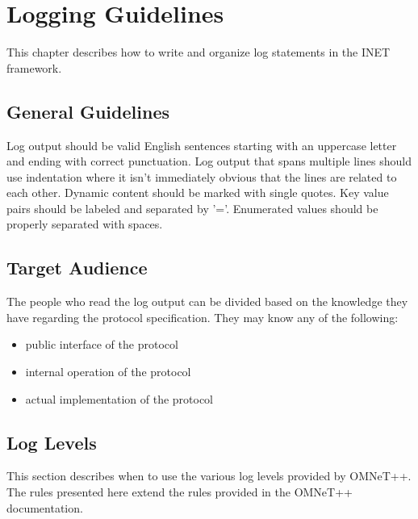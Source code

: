 \chapter{Logging Guidelines}
\label{cha:logging}


This chapter describes how to write and organize log statements in the INET
framework.

\section{General Guidelines}

Log output should be valid English sentences starting with an uppercase letter
and ending with correct punctuation. Log output that spans multiple lines should
use indentation where it isn't immediately obvious that the lines are related to
each other. Dynamic content should be marked with single quotes. Key value pairs
should be labeled and separated by '='. Enumerated values should be properly
separated with spaces.

\section{Target Audience}

The people who read the log output can be divided based on the knowledge they
have regarding the protocol specification. They may know any of the following:

\begin{itemize}
	\item public interface of the protocol
 	\item internal operation of the protocol
 	\item actual implementation of the protocol
\end{itemize}

\section{Log Levels}

This section describes when to use the various log levels provided by OMNeT++.
The rules presented here extend the rules provided in the OMNeT++ documentation.

